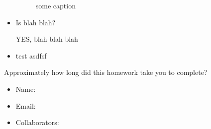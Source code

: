 \documentclass[submit]{harvardml}
\newenvironment{answer}{%
\color{answergreen}\sffamily\large}{}
\begin{document}
    \begin{itemize}

        \begin{figure}[H]
            \centering
            \caption{some caption}
            \label{somelabel}
        \end{figure}
            
        \item Is blah blah?

            \begin{answer}
            YES,  blah blah blah
            \end{answer}

        \item test 
            asdfsf

    \end{itemize}


\newpage


\begin{problem}[Calibration, 1pt]
Approximately how long did this homework take you to complete?
\end{problem}


\begin{itemize}
    \item Name:
    \item Email:
    \item Collaborators:
\end{itemize}
\end{document}

